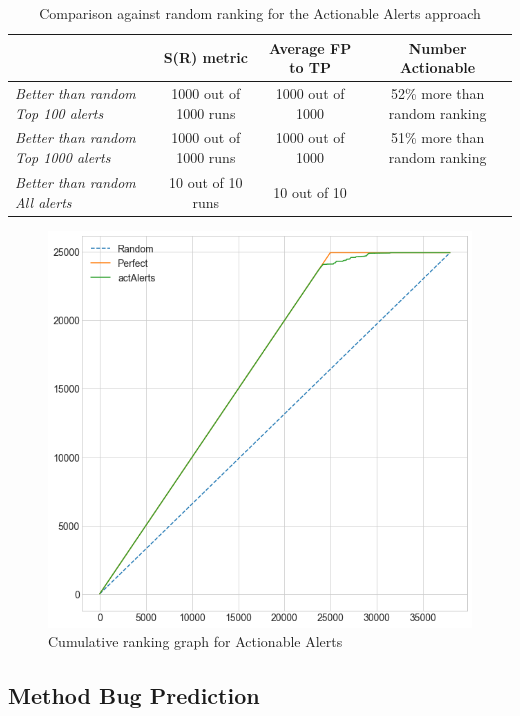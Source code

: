 \begin{table}[H]
	\caption{Comparison against random ranking for the Actionable Alerts approach}
	\label{results:ranking_actalerts}
	\centering
	\begin{tabular}{@{}lccc@{}}
		\toprule
		& \textbf{S(R) metric}  & \textbf{Average FP to TP} & \textbf{Number Actionable}    \\ \midrule
		\textit{Better than random Top 100 alerts}  & 1000 out of 1000 runs & 1000 out of 1000          & 52\% more than random ranking \\
		\textit{Better than random Top 1000 alerts} & 1000 out of 1000 runs & 1000 out of 1000          & 51\% more than random ranking \\
		\textit{Better than random All alerts}      & 10 out of 10 runs     & 10 out of 10              & \multicolumn{1}{l}{}          \\ \bottomrule
	\end{tabular}
\end{table}

\begin{figure}[H]
	\centering
	\includegraphics[scale=0.4]{./src/actAlerts/cumulative_graph_all.png}
	\caption{Cumulative ranking graph for Actionable Alerts}
	\label{results:cumulative_actalerts}
\end{figure}


\subsection{Method Bug Prediction}

